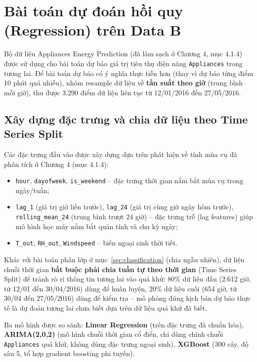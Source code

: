\section{Bài toán dự đoán hồi quy (Regression) trên Data B}
\label{sec:regression}

Bộ dữ liệu Appliances Energy Prediction (đã làm sạch ở Chương 4, mục 4.1.4) được sử dụng cho bài toán dự báo giá trị tiêu thụ điện năng \texttt{Appliances} trong tương lai. Để bài toán dự báo có ý nghĩa thực tiễn hơn (thay vì dự báo từng điểm 10 phút quá nhiễu), nhóm resample dữ liệu về \textbf{tần suất theo giờ} (trung bình mỗi giờ), thu được 3.290 điểm dữ liệu liên tục từ 12/01/2016 đến 27/05/2016.

\subsection{Xây dựng đặc trưng và chia dữ liệu theo Time Series Split}

Các đặc trưng đầu vào được xây dựng dựa trên phát hiện về tính mùa vụ đã phân tích ở Chương 4 (mục 4.1.4):
\begin{itemize}
    \item \texttt{hour}, \texttt{dayofweek}, \texttt{is\_weekend} -- đặc trưng thời gian nắm bắt mùa vụ trong ngày/tuần;
    \item \texttt{lag\_1} (giá trị giờ liền trước), \texttt{lag\_24} (giá trị cùng giờ ngày hôm trước), \texttt{rolling\_mean\_24} (trung bình trượt 24 giờ) -- đặc trưng trễ (lag features) giúp mô hình học máy nắm bắt quán tính và chu kỳ ngày;
    \item \texttt{T\_out}, \texttt{RH\_out}, \texttt{Windspeed} -- biến ngoại sinh thời tiết.
\end{itemize}

Khác với bài toán phân lớp ở mục~\ref{sec:classification} (chia ngẫu nhiên), dữ liệu chuỗi thời gian \textbf{bắt buộc phải chia tuần tự theo thời gian} (Time Series Split) để tránh rò rỉ thông tin tương lai vào quá khứ: 80\% dữ liệu đầu (2.612 giờ, từ 12/01 đến 30/04/2016) dùng để huấn luyện, 20\% dữ liệu cuối (654 giờ, từ 30/04 đến 27/05/2016) dùng để kiểm tra -- mô phỏng đúng kịch bản dự báo thực tế là dự đoán tương lai chưa biết dựa trên dữ liệu quá khứ đã biết.

Ba mô hình được so sánh: \textbf{Linear Regression} (trên đặc trưng đã chuẩn hóa), \textbf{ARIMA(2,0,2)} (mô hình chuỗi thời gian cổ điển, chỉ dùng chính chuỗi \texttt{Appliances} quá khứ, không dùng đặc trưng ngoại sinh), \textbf{XGBoost} (300 cây, độ sâu 5, tổ hợp gradient boosting phi tuyến).

